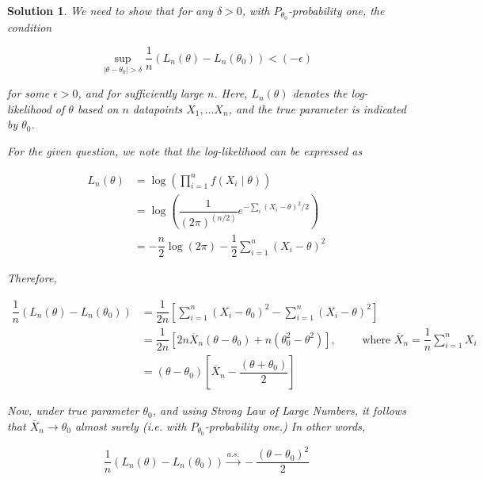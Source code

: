 \documentclass[12pt]{article}
\theoremstyle{problemstyle}
\newtheorem*{solution*}{Solution}
\begin{document}
\begin{solution*}
    We need to show that for any $\delta > 0$, with $P_{\theta_0}$-probability one, the condition 

    \begin{equation}
        \sup_{\vert \theta - \theta_0 \vert > \delta} \dfrac{1}{n}(L_n(\theta) - L_n(\theta_0)) < (-\epsilon)
        \label{eqn:q5-1}    
    \end{equation}
    
    \noindent for some $\epsilon > 0$, and for sufficiently large $n$. Here, $L_n(\theta)$ denotes the log-likelihood of $\theta$ based on $n$ datapoints $X_1, \dots X_n$, and the true parameter is indicated by $\theta_0$. 
    
    For the given question, we note that the log-likelihood can be expressed as 

    \begin{align*}
        L_n(\theta)
        & = \log\left( \prod_{i = 1}^n f(X_i \mid \theta) \right)\\
        & = \log\left( \dfrac{1}{(2\pi)^{(n/2)}} e^{-\sum_i (X_i - \theta)^2 / 2} \right)\\
        & = -\dfrac{n}{2}\log(2\pi) - \dfrac{1}{2}\sum_{i = 1}^n (X_i - \theta)^2
    \end{align*}

    Therefore,

    \begin{align*}
        \dfrac{1}{n}(L_n(\theta) - L_n(\theta_0))
        & = \dfrac{1}{2n} \left[ \sum_{i = 1}^n (X_i - \theta_0)^2 - \sum_{i = 1}^n (X_i - \theta)^2 \right]\\
        & = \dfrac{1}{2n} \left[ 2n\overline{X}_n (\theta - \theta_0) + n (\theta_0^2 - \theta^2) \right], \qquad \text{ where } \overline{X}_n = \dfrac{1}{n}\sum_{i=1}^n X_i\\
        & = (\theta - \theta_0) \left[ \overline{X}_n - \dfrac{(\theta + \theta_0)}{2} \right]
    \end{align*}

    Now, under true parameter $\theta_0$, and using Strong Law of Large Numbers, it follows that $\overline{X}_n \rightarrow \theta_0$ almost surely (i.e. with $P_{\theta_0}$-probability one.) In other words,

    \begin{equation*}
        \dfrac{1}{n}(L_n(\theta) - L_n(\theta_0)) \xrightarrow{a.s.} -\dfrac{(\theta - \theta_0)^2}{2}
    \end{equation*}


\end{solution*}
\end{document}
